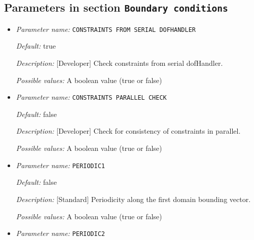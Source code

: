 \subsection{Parameters in section \tt Boundary conditions}
\label{parameters:Boundary_20conditions}

\begin{itemize}
\item {\it Parameter name:} {\tt CONSTRAINTS FROM SERIAL DOFHANDLER}
\label{parameters:Boundary conditions/CONSTRAINTS FROM SERIAL DOFHANDLER}
\label{parameters:Boundary_20conditions/CONSTRAINTS_20FROM_20SERIAL_20DOFHANDLER}




{\it Default:} true


{\it Description:} [Developer] Check constraints from serial dofHandler.


{\it Possible values:} A boolean value (true or false)
\item {\it Parameter name:} {\tt CONSTRAINTS PARALLEL CHECK}
\label{parameters:Boundary conditions/CONSTRAINTS PARALLEL CHECK}
\label{parameters:Boundary_20conditions/CONSTRAINTS_20PARALLEL_20CHECK}




{\it Default:} false


{\it Description:} [Developer] Check for consistency of constraints in parallel.


{\it Possible values:} A boolean value (true or false)
\item {\it Parameter name:} {\tt PERIODIC1}
\label{parameters:Boundary conditions/PERIODIC1}
\label{parameters:Boundary_20conditions/PERIODIC1}




{\it Default:} false


{\it Description:} [Standard] Periodicity along the first domain bounding vector.


{\it Possible values:} A boolean value (true or false)
\item {\it Parameter name:} {\tt PERIODIC2}
\label{parameters:Boundary conditions/PERIODIC2}
\label{parameters:Boundary_20conditions/PERIODIC2}



\end{itemize}
